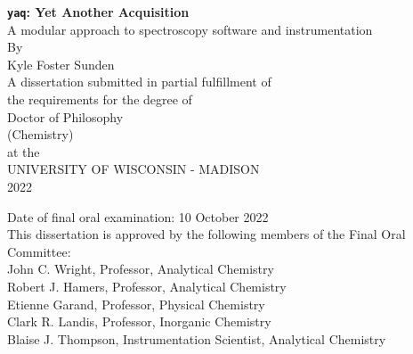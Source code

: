 \documentclass{dissertation}
\begin{document}
\raggedbottom


\begin{centering}
\thispagestyle{empty}


\textbf{\texttt{yaq}: Yet Another Acquisition} \\
A modular approach to spectroscopy software and instrumentation \\
\vspace{80 pt}
By \\
Kyle Foster Sunden \\
\vspace{40 pt}
A dissertation submitted in partial fulfillment of \\
the requirements for the degree of \\
\vspace{10 pt}
Doctor of Philosophy \\ (Chemistry) \\
\vspace{40 pt}
at the \\
UNIVERSITY OF WISCONSIN - MADISON \\
2022 \\
\end{centering}

\vfill

\noindent Date of final oral examination: 10 October 2022 \\
This dissertation is approved by the following members of the Final Oral Committee: \\
\-\hspace{1cm} John C. Wright, Professor, Analytical Chemistry \\
\-\hspace{1cm} Robert J. Hamers, Professor, Analytical Chemistry \\
\-\hspace{1cm} Etienne Garand, Professor, Physical Chemistry \\
\-\hspace{1cm} Clark R. Landis, Professor, Inorganic Chemistry \\
\-\hspace{1cm} Blaise J. Thompson, Instrumentation Scientist, Analytical Chemistry \\

\cleardoublepage
\end{document}
